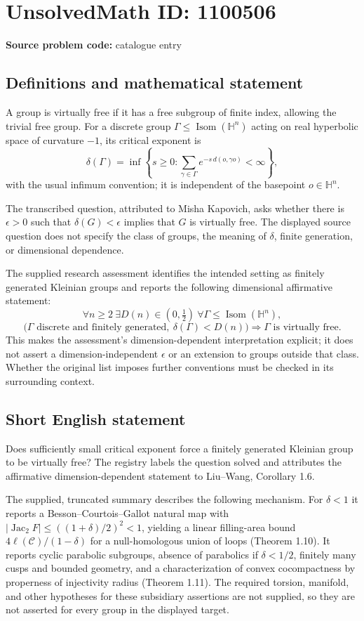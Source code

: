 \documentclass[11pt]{article}
\begin{document}
\section*{UnsolvedMath ID: 1100506}
\textbf{Source problem code:} catalogue entry
\subsection{Definitions and mathematical statement}
A group is virtually free if it has a free subgroup of finite index, allowing the trivial free group. For a discrete group $\Gamma\leq\operatorname{Isom}(\mathbb H^n)$ acting on real hyperbolic space of curvature $-1$, its critical exponent is
\[
 \delta(\Gamma)=\inf\left\{s\geq0:
 \sum_{\gamma\in\Gamma}e^{-s\,d(o,\gamma o)}<\infty\right\},
\]
with the usual infimum convention; it is independent of the basepoint $o\in\mathbb H^n$.

The transcribed question, attributed to Misha Kapovich, asks whether there is $\epsilon>0$ such that $\delta(G)<\epsilon$ implies that $G$ is virtually free. The displayed source question does not specify the class of groups, the meaning of $\delta$, finite generation, or dimensional dependence.

The supplied research assessment identifies the intended setting as finitely generated Kleinian groups and reports the following dimensional affirmative statement:
\[
 \forall n\geq2\ \exists D(n)\in(0,\tfrac12)\ \forall\Gamma\leq\operatorname{Isom}(\mathbb H^n),
\]
\[
 \bigl(\Gamma\text{ discrete and finitely generated},\
       \delta(\Gamma)<D(n)\bigr)
 \Longrightarrow\Gamma\text{ is virtually free}.
\]
This makes the assessment's dimension-dependent interpretation explicit; it does not assert a dimension-independent $\epsilon$ or an extension to groups outside that class. Whether the original list imposes further conventions must be checked in its surrounding context.
\subsection{Short English statement}
Does sufficiently small critical exponent force a finitely generated Kleinian group to be virtually free? The registry labels the question solved and attributes the affirmative dimension-dependent statement to Liu--Wang, Corollary 1.6.

The supplied, truncated summary describes the following mechanism. For $\delta<1$ it reports a Besson--Courtois--Gallot natural map with
$|\operatorname{Jac}_2F|\leq((1+\delta)/2)^2<1$, yielding a linear filling-area bound $4\ell(\mathcal C)/(1-\delta)$ for a null-homologous union of loops (Theorem 1.10). It reports cyclic parabolic subgroups, absence of parabolics if $\delta<1/2$, finitely many cusps and bounded geometry, and a characterization of convex cocompactness by properness of injectivity radius (Theorem 1.11). The required torsion, manifold, and other hypotheses for these subsidiary assertions are not supplied, so they are not asserted for every group in the displayed target.
\end{document}
